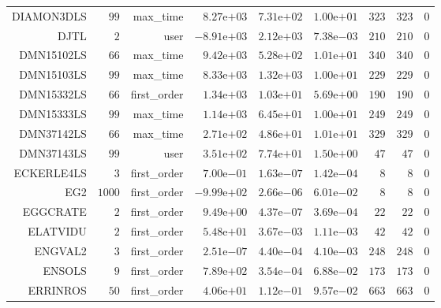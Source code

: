 \begin{longtable}{rrrrrrrrr}
DIAMON3DLS & \(    99\) & max\_time & \( 8.27\)e\(+03\) & \( 7.31\)e\(+02\) & \( 1.00\)e\(+01\) & \(   323\) & \(   323\) & \(     0\) \\
DJTL & \(     2\) & user & \(-8.91\)e\(+03\) & \( 2.12\)e\(+03\) & \( 7.38\)e\(-03\) & \(   210\) & \(   210\) & \(     0\) \\
DMN15102LS & \(    66\) & max\_time & \( 9.42\)e\(+03\) & \( 5.28\)e\(+02\) & \( 1.01\)e\(+01\) & \(   340\) & \(   340\) & \(     0\) \\
DMN15103LS & \(    99\) & max\_time & \( 8.33\)e\(+03\) & \( 1.32\)e\(+03\) & \( 1.00\)e\(+01\) & \(   229\) & \(   229\) & \(     0\) \\
DMN15332LS & \(    66\) & first\_order & \( 1.34\)e\(+03\) & \( 1.03\)e\(+01\) & \( 5.69\)e\(+00\) & \(   190\) & \(   190\) & \(     0\) \\
DMN15333LS & \(    99\) & max\_time & \( 1.14\)e\(+03\) & \( 6.45\)e\(+01\) & \( 1.00\)e\(+01\) & \(   249\) & \(   249\) & \(     0\) \\
DMN37142LS & \(    66\) & max\_time & \( 2.71\)e\(+02\) & \( 4.86\)e\(+01\) & \( 1.01\)e\(+01\) & \(   329\) & \(   329\) & \(     0\) \\
DMN37143LS & \(    99\) & user & \( 3.51\)e\(+02\) & \( 7.74\)e\(+01\) & \( 1.50\)e\(+00\) & \(    47\) & \(    47\) & \(     0\) \\
ECKERLE4LS & \(     3\) & first\_order & \( 7.00\)e\(-01\) & \( 1.63\)e\(-07\) & \( 1.42\)e\(-04\) & \(     8\) & \(     8\) & \(     0\) \\
EG2 & \(  1000\) & first\_order & \(-9.99\)e\(+02\) & \( 2.66\)e\(-06\) & \( 6.01\)e\(-02\) & \(     8\) & \(     8\) & \(     0\) \\
EGGCRATE & \(     2\) & first\_order & \( 9.49\)e\(+00\) & \( 4.37\)e\(-07\) & \( 3.69\)e\(-04\) & \(    22\) & \(    22\) & \(     0\) \\
ELATVIDU & \(     2\) & first\_order & \( 5.48\)e\(+01\) & \( 3.67\)e\(-03\) & \( 1.11\)e\(-03\) & \(    42\) & \(    42\) & \(     0\) \\
ENGVAL2 & \(     3\) & first\_order & \( 2.51\)e\(-07\) & \( 4.40\)e\(-04\) & \( 4.10\)e\(-03\) & \(   248\) & \(   248\) & \(     0\) \\
ENSOLS & \(     9\) & first\_order & \( 7.89\)e\(+02\) & \( 3.54\)e\(-04\) & \( 6.88\)e\(-02\) & \(   173\) & \(   173\) & \(     0\) \\
ERRINROS & \(    50\) & first\_order & \( 4.06\)e\(+01\) & \( 1.12\)e\(-01\) & \( 9.57\)e\(-02\) & \(   663\) & \(   663\) & \(     0\) \\

\end{longtable}

